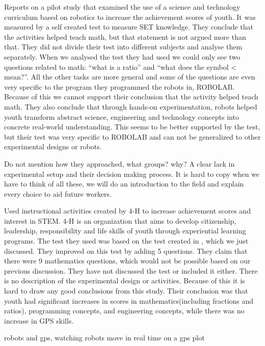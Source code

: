 \bigskip\noindent
\cite{barker2007robotics} Reports on a pilot study that examined the use of a science and technology curriculum based on robotics to increase the achievement scores of youth. It was measured by a self created test to measure SET knowledge. They conclude that the activities helped teach math, but that statement is not argued more than that. They did not divide their test into different subjects and analyse them separately. When we analysed the test they had used we could only see two questions related to math: ``what is a ratio'' and ``what does the symbol < mean?''. All the other tasks are more general and some of the questions are even very specific to the program they programmed the robots in, ROBOLAB. Because of this we cannot support their conclusion that the activity helped teach math. They also conclude that through hands-on experimentation, robots helped youth transform abstract science, engineering and technology concepts into concrete real-world understanding. This seems to be better supported by the test, but their test was very specific to ROBOLAB and can not be generalized to other experimental designs or robots.

\bigskip\noindent
\cite{barker2007robotics} Do not mention how they approached, what groups? why?
\cite{nugent2008effect} A clear lack in experimental setup and their decision making process. It is hard to copy when we have to think of all these, we will do an introduction to the field and explain every choice to aid future workers. 

\bigskip\noindent
\cite{nugent2008effect} Used instructional activities created by 4-H to increase achievement scores and interest in STEM. 4-H is an organization that aims to develop citizenship, leadership, responsibility and life skills of youth through experiential learning programs. The test they used was based on the test created in \cite{barker2007robotics}, which we just discussed. They improved on this test by adding 5 questions. They claim that there were 9 mathematics questions, which would not be possible based on our previous discussion. They have not discussed the test or included it either. There is no description of the experimental design or activities. Because of this it is hard to draw any good conclusions from this study. Their conclusion was that youth had significant increases in scores in mathematics(including fractions and ratios), programming concepts, and engineering concepts, while there was no increase in GPS skills.

\bigskip\noindent
\cite{nugent2008effect} robots and gps, watching robots move in real time on a gps plot

